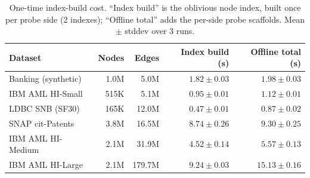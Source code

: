 \begin{table}[t]
\centering
\begin{tabular}{lrrrr}
\toprule
\textbf{Dataset} & \textbf{Nodes} & \textbf{Edges} & \textbf{Index build (s)} & \textbf{Offline total (s)} \\
\midrule
Banking (synthetic) & 1.0M & 5.0M & $1.82 \pm 0.03$ & $1.98 \pm 0.03$ \\
IBM AML HI-Small & 515K & 5.1M & $0.95 \pm 0.01$ & $1.12 \pm 0.01$ \\
LDBC SNB (SF30) & 165K & 12.0M & $0.47 \pm 0.01$ & $0.87 \pm 0.02$ \\
SNAP cit-Patents & 3.8M & 16.5M & $8.74 \pm 0.26$ & $9.30 \pm 0.25$ \\
IBM AML HI-Medium & 2.1M & 31.9M & $4.52 \pm 0.14$ & $5.57 \pm 0.13$ \\
IBM AML HI-Large & 2.1M & 179.7M & $9.24 \pm 0.03$ & $15.13 \pm 0.16$ \\
\bottomrule
\end{tabular}
\caption{One-time index-build cost. ``Index build'' is the oblivious node index, built once per probe side (2 indexes); ``Offline total'' adds the per-side probe scaffolds. Mean $\pm$ stddev over 3 runs.}
\label{tab:index_build}
\end{table}
